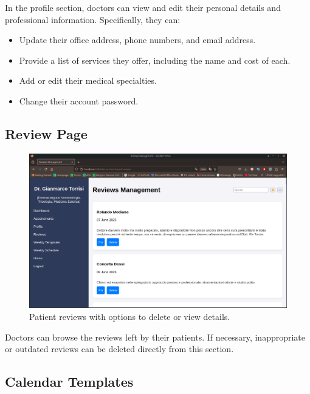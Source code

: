 In the profile section, doctors can view and edit their personal details and professional information. Specifically, they can:
\begin{itemize}
	\item Update their office address, phone numbers, and email address.
	\item Provide a list of services they offer, including the name and cost of each.
	\item Add or edit their medical specialties.
	\item Change their account password.
\end{itemize}

\subsection{Review Page}

\begin{figure}[!h]
	\centering
	\includegraphics[scale=0.30]{resources/screenshots/doctor_ui/reviews.png}
	\caption{Patient reviews with options to delete or view details.}
	\label{fig:patient_reviews}
\end{figure}

Doctors can browse the reviews left by their patients. If necessary, inappropriate or outdated reviews can be deleted directly from this section.

\subsection{Calendar Templates}

